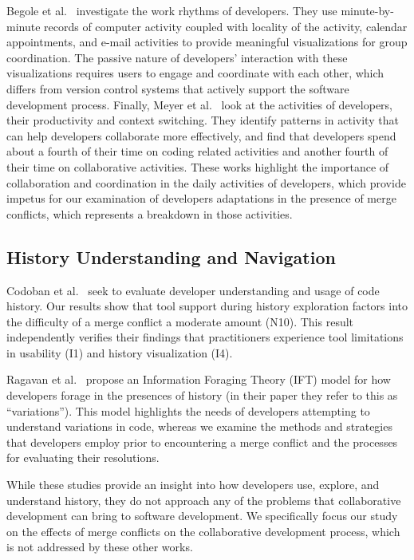Begole et al.~\cite{begole_work_2002} investigate the work rhythms of developers.
They use minute-by-minute records of computer activity coupled with locality of the activity, calendar appointments, and e-mail activities to provide meaningful visualizations for group coordination.
The passive nature of developers' interaction with these visualizations requires users to engage and coordinate with each other, which differs from version control systems that actively support the software development process.
Finally, Meyer et al.~\cite{meyer_work_2017} look at the activities of developers, their productivity and context switching.
They identify patterns in activity that can help developers collaborate more effectively, and find that developers spend about a fourth of their time on coding related activities and another fourth of their time on collaborative activities.
These works highlight the importance of collaboration and coordination in the daily activities of developers, which provide impetus for our examination of developers adaptations in the presence of merge conflicts, which represents a breakdown in those activities.

\subsection{History Understanding and Navigation}

Codoban et al.~\cite{Mihai_lenses} seek to evaluate developer understanding and usage of code history. 
Our results show that tool support during history exploration factors into the difficulty of a merge conflict a moderate amount (N10). 
This result independently verifies their findings that practitioners experience tool limitations in usability (I1) and history visualization (I4).

Ragavan et al.~\cite{ragavan_pfis-v_2017} propose an Information Foraging Theory (IFT) model for how developers forage in the presences of history (in their paper they refer to this as ``variations'').
This model highlights the needs of developers attempting to understand variations in code, whereas we examine the methods and strategies that developers employ prior to encountering a merge conflict and the processes for evaluating their resolutions.

While these studies provide an insight into how developers use, explore, and understand history, they do not approach any of the problems that collaborative development can bring to software development.
We specifically focus our study on the effects of merge conflicts on the collaborative development process, which is not addressed by these other works.

